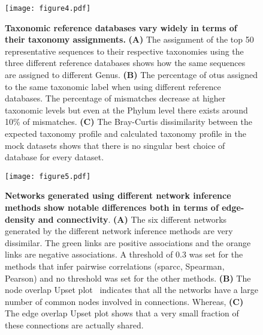   \begin{figure}[H]
    \centering
    \texttt{[image: figure4.pdf]}
  \end{figure}
  \begin{figure}[H]
    \centering
    \caption{
      \textbf{Taxonomic reference databases vary widely in terms of their taxonomy assignments.}
      \textbf{(A)} The assignment of the top 50 representative sequences to their respective taxonomies using the three different reference databases shows how the same sequences are assigned to different Genus.
      \textbf{(B)} The percentage of \ac{otu}s assigned to the same taxonomic label when using different reference databases.
      The percentage of mismatches decrease at higher taxonomic levels but even at the Phylum level there exists around 10\% of mismatches.
      \textbf{(C)} The Bray-Curtis dissimilarity between the expected taxonomy profile and calculated taxonomy profile in the mock datasets shows that there is no singular best choice of database for every dataset.
    }
    \label{fig:figure4}
  \end{figure}
  \FloatBarrier
  \newpage
  
  
  \begin{figure}[H]
    \centering
    \texttt{[image: figure5.pdf]}
  \end{figure}
  \begin{figure}[H]
    \centering
    \caption{
      \textbf{Networks generated using different network inference methods show notable differences both in terms of edge-density and connectivity}.
      \textbf{(A)} The six different networks generated by the different network inference methods are very dissimilar.
      The green links are positive associations and the orange links are negative associations.
      A threshold of 0.3 was set for the methods that infer pairwise correlations (\ac{sparcc}, Spearman, Pearson) and no threshold was set for the other methods.
      \textbf{(B)} The node overlap Upset plot~\cite{Lex} indicates that all the networks have a large number of common nodes involved in connections.
      Whereas, \textbf{(C)} The edge overlap Upset plot shows that a very small fraction of these connections are actually shared.
    }
    \label{fig:figure5}
  \end{figure}
  \FloatBarrier
  \newpage
  
